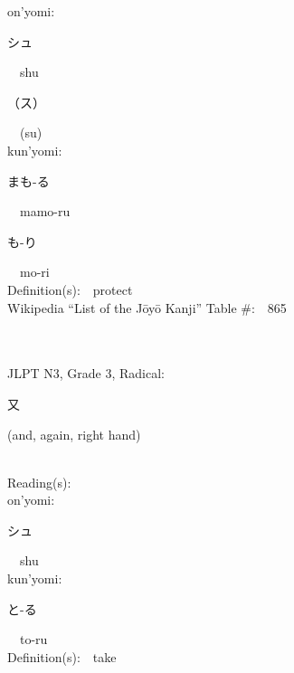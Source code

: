 \begin{multicols}{2}
{\hspace*{1em}}on'yomi:\ \ \\
{\hspace*{2em}}{\begin{CJK}{UTF8}{min} シュ \end{CJK}}\ \ shu\ \ \\
{\hspace*{2em}}{\begin{CJK}{UTF8}{min} （ス） \end{CJK}}\ \ (su)\ \ \\
{\hspace*{1em}}kun'yomi:\ \ \\
{\hspace*{2em}}{\begin{CJK}{UTF8}{min} まも-る \end{CJK}}\ \ mamo-ru\ \ \\
{\hspace*{2em}}{\begin{CJK}{UTF8}{min} も-り \end{CJK}}\ \ mo-ri\ \ \\
Definition(s):\ \ protect \\
Wikipedia ``List of the J\=oy\=o Kanji'' Table \#:\ \ 865 \\
\ \ \\
{\fontsize{34pt}{40pt}  }\ \ \\  %
{JLPT N3, Grade 3, Radical:\ \ {\begin{CJK}{UTF8}{min} 又 \end{CJK}} (and, again, right hand) } \\
Reading(s):\ \ \\
{\hspace*{1em}}on'yomi:\ \ \\
{\hspace*{2em}}{\begin{CJK}{UTF8}{min} シュ \end{CJK}}\ \ shu\ \ \\
{\hspace*{1em}}kun'yomi:\ \ \\
{\hspace*{2em}}{\begin{CJK}{UTF8}{min} と-る \end{CJK}}\ \ to-ru\ \ \\
Definition(s):\ \ take \\

\end{multicols}
